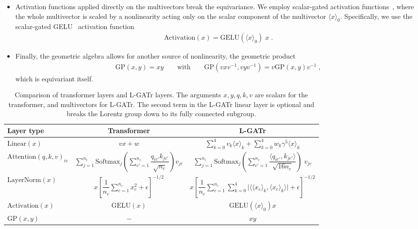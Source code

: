 \documentclass[submission, Phys]{SciPost}
\begin{document}
\begin{itemize}
\item Activation functions applied directly on the multivectors break the equivariance. We employ scalar-gated activation functions~\cite{brehmer2023geometric}, where the whole multivector is scaled by a nonlinearity acting only on the scalar component of the multivector $\langle x\rangle_0$. Specifically, we use the scalar-gated GELU~\cite{hendrycks2016gaussian} activation function
%
\begin{align}
    \text{Activation}(x) = \text{GELU}(\langle x\rangle_0 ) \; x \; .
\end{align}

\item Finally, the geometric algebra allows for another source of nonlinearity, the geometric product
%
\begin{align}
    \text{GP}(x,y) = xy
    \qquad \text{with} \qquad 
    \text{GP}(vxv^{-1}, vyv^{-1}) = v\text{GP}(x,y)v^{-1} \; ,
\end{align}
%
which is equivariant itself. 
\end{itemize}

\begin{table}[t]
    \centering
    \begin{small} \begin{tabular}{l c c}
        \toprule
        Layer type & Transformer & L-GATr \\[1mm]
        \midrule
        $\text{Linear}(x)$ & $v x + w$ & $\sum_{k=0}^4 v_k\langle x\rangle_k + \sum_{k=0}^4 w_k \gamma^5 \langle x\rangle_k$ \\[2mm]
        $\text{Attention}(q,k,v)_{ic}$ & $\sum_{j=1}^{n_t} \text{Softmax}_j\left(\sum_{c'=1}^{n_c}\dfrac{q_{ic'}k_{jc'}}{\sqrt{n_c}}\right) v_{jc}$ & $\sum_{j=1}^{n_t} \text{Softmax}_j \left( \sum_{c'=1}^{n_c}\dfrac {\langle q_{ic'}, k_{jc'}\rangle} {\sqrt{16n_c}} \right) \; v_{jc}$ \\[4mm]
        $\text{LayerNorm}(x)$ & $x \left[ \dfrac{1}{n_c}\sum_{c=1}^{n_c} x_c^2 + \epsilon \right]^{-1/2}$ &  $x\left[ \dfrac{1}{n_c} \sum_{c=1}^{n_c} \sum_{k=0}^4 \Big\rvert \Big\langle \langle x_c \rangle_k, \langle x_c\rangle_k \Big\rangle \Big\rvert + \epsilon \right]^{-1/2}$ \\[4mm]
        $\text{Activation}(x)$ & $\text{GELU}(x)$ & $\text{GELU}(\langle x\rangle_0) x$ \\[2mm]
        $\text{GP}(x, y)$ & $-$ & $xy$ \\
        \bottomrule
    \end{tabular} \end{small}
    \caption{Comparison of transformer layers and L-GATr layers. The arguments $x, y, q, k, v$ are scalars for the transformer, and multivectors for L-GATr. The second term in the L-GATr linear layer is optional and breaks the Lorentz group down to its fully connected subgroup.} 
    \label{tab:layers}
\end{table}
\end{document}
